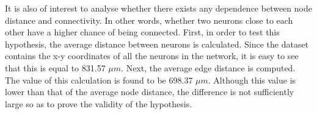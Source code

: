 It is also of interest to analyse whether there exists any dependence between node distance and connectivity. In other words, whether two neurons close to each other have a higher chance of being connected. First, in order to test this hypothesis, the average distance between neurons is calculated. Since the dataset contains the x-y coordinates of all the neurons in the network, it is easy to see that this is equal to 831.57 \(\mu m\). Next, the average edge distance is computed. The value of this calculation is found to be 698.37 \(\mu m\). Although this value is lower than that of the average node distance, the difference is not sufficiently large so as to prove the validity of the hypothesis.








